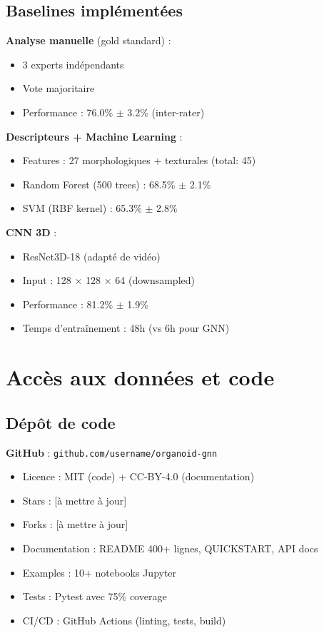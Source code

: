 \subsection{Baselines implémentées}

\textbf{Analyse manuelle} (gold standard) :
\begin{itemize}
    \item 3 experts indépendants
    \item Vote majoritaire
    \item Performance : 76.0\% $\pm$ 3.2\% (inter-rater)
\end{itemize}

\textbf{Descripteurs + Machine Learning} :
\begin{itemize}
    \item Features : 27 morphologiques + texturales (total: 45)
    \item Random Forest (500 trees) : 68.5\% $\pm$ 2.1\%
    \item SVM (RBF kernel) : 65.3\% $\pm$ 2.8\%
\end{itemize}

\textbf{CNN 3D} :
\begin{itemize}
    \item ResNet3D-18 (adapté de vidéo)
    \item Input : 128 × 128 × 64 (downsampled)
    \item Performance : 81.2\% $\pm$ 1.9\%
    \item Temps d'entraînement : 48h (vs 6h pour GNN)
\end{itemize}

\section{Accès aux données et code}

\subsection{Dépôt de code}

\textbf{GitHub} : \texttt{github.com/username/organoid-gnn}
\begin{itemize}
    \item Licence : MIT (code) + CC-BY-4.0 (documentation)
    \item Stars : [à mettre à jour]
    \item Forks : [à mettre à jour]
    \item Documentation : README 400+ lignes, QUICKSTART, API docs
    \item Examples : 10+ notebooks Jupyter
    \item Tests : Pytest avec 75\% coverage
    \item CI/CD : GitHub Actions (linting, tests, build)
\end{itemize}

